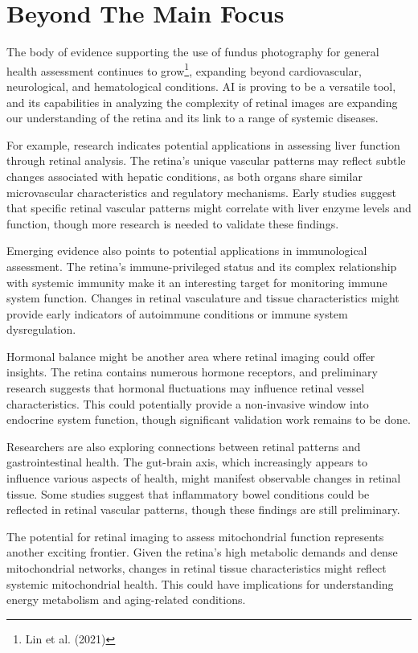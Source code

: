 \documentclass[
  Letterpaper,
]{scrbook}
\begin{document}
\section{Beyond The Main Focus}\label{beyond-the-main-focus}

The body of evidence supporting the use of fundus photography for
general health assessment continues to grow\footnote{Lin et al. (2021)},
expanding beyond cardiovascular, neurological, and hematological
conditions. AI is proving to be a versatile tool, and its capabilities
in analyzing the complexity of retinal images are expanding our
understanding of the retina and its link to a range of systemic
diseases.

For example, research indicates potential applications in assessing
liver function through retinal analysis. The retina's unique vascular
patterns may reflect subtle changes associated with hepatic conditions,
as both organs share similar microvascular characteristics and
regulatory mechanisms. Early studies suggest that specific retinal
vascular patterns might correlate with liver enzyme levels and function,
though more research is needed to validate these findings.

Emerging evidence also points to potential applications in immunological
assessment. The retina's immune-privileged status and its complex
relationship with systemic immunity make it an interesting target for
monitoring immune system function. Changes in retinal vasculature and
tissue characteristics might provide early indicators of autoimmune
conditions or immune system dysregulation.

Hormonal balance might be another area where retinal imaging could offer
insights. The retina contains numerous hormone receptors, and
preliminary research suggests that hormonal fluctuations may influence
retinal vessel characteristics. This could potentially provide a
non-invasive window into endocrine system function, though significant
validation work remains to be done.

Researchers are also exploring connections between retinal patterns and
gastrointestinal health. The gut-brain axis, which increasingly appears
to influence various aspects of health, might manifest observable
changes in retinal tissue. Some studies suggest that inflammatory bowel
conditions could be reflected in retinal vascular patterns, though these
findings are still preliminary.

The potential for retinal imaging to assess mitochondrial function
represents another exciting frontier. Given the retina's high metabolic
demands and dense mitochondrial networks, changes in retinal tissue
characteristics might reflect systemic mitochondrial health. This could
have implications for understanding energy metabolism and aging-related
conditions.
\end{document}
